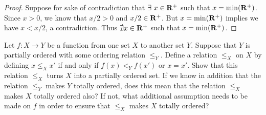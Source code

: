 \begin{proof}
    Suppose for sake of contradiction that \(\exists\ x \in \mathbf{R}^+\) such that \(x = \min(\mathbf{R}^+)\).
    Since \(x > 0\), we know that \(x / 2 > 0\) and \(x / 2 \in \mathbf{R}^+\).
    But \(x = \min(\mathbf{R}^+)\) implies we have \(x < x / 2\), a contradiction.
    Thus \(\nexists x \in \mathbf{R}^+\) such that \(x = \min(\mathbf{R}^+)\).
\end{proof}

\begin{exercise}\label{ex 8.5.5}
    Let \(f : X \to Y\) be a function from one set \(X\) to another set \(Y\).
    Suppose that \(Y\) is partially ordered with some ordering relation \(\leq_Y\).
    Define a relation \(\leq_X\) on \(X\) by defining \(x \leq_X x'\) if and only if \(f(x) <_Y f(x')\) or \(x = x'\).
    Show that this relation \(\leq_X\) turns \(X\) into a partially ordered set.
    If we know in addition that the relation \(\leq_Y\) makes \(Y\) totally ordered, does this mean that the relation \(\leq_X\) makes \(X\) totally ordered also?
    If not, what additional assumption needs to be made on \(f\) in order to ensure that \(\leq_X\) makes \(X\) totally ordered?
\end{exercise}

